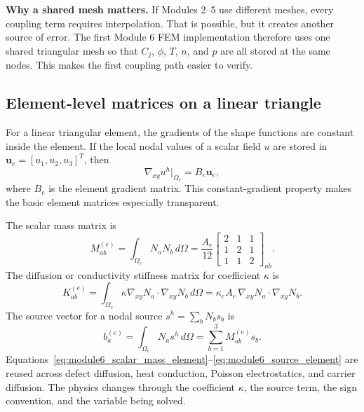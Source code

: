 \documentclass[11pt]{article}
\newcommand{\gradxy}{\nabla_{xy}}
\begin{document}
\begin{physicsbox}
\textbf{Why a shared mesh matters.} If Modules 2--5 use different meshes, every coupling term requires interpolation. That is possible, but it creates another source of error. The first Module 6 FEM implementation therefore uses one shared triangular mesh so that \(C_j\), \(\phi\), \(T\), \(n\), and \(p\) are all stored at the same nodes. This makes the first coupling path easier to verify.
\end{physicsbox}

\subsection{Element-level matrices on a linear triangle}

For a linear triangular element, the gradients of the shape functions are constant inside the element. If the local nodal values of a scalar field \(u\) are stored in \(\mathbf{u}_e=[u_1,u_2,u_3]^T\), then
\begin{equation}
\gradxy u^h\big|_{\Omega_e}
= B_e \mathbf{u}_e,
\end{equation}
where \(B_e\) is the element gradient matrix. This constant-gradient property makes the basic element matrices especially transparent.

The scalar mass matrix is
\begin{equation}
\boxed{
M^{(e)}_{ab}=\int_{\Omega_e}N_aN_b\,d\Omega
=\frac{A_e}{12}
\begin{bmatrix}
2&1&1\\
1&2&1\\
1&1&2
\end{bmatrix}_{ab}.}
\label{eq:module6_scalar_mass_element}
\end{equation}
The diffusion or conductivity stiffness matrix for coefficient \(\kappa\) is
\begin{equation}
\boxed{
K^{(e)}_{ab}=\int_{\Omega_e}\kappa\gradxy N_a\cdot\gradxy N_b\,d\Omega
=\kappa_e A_e\,\gradxy N_a\cdot\gradxy N_b.}
\label{eq:module6_stiffness_element}
\end{equation}
The source vector for a nodal source \(s^h=\sum_b N_bs_b\) is
\begin{equation}
\boxed{
b^{(e)}_a=\int_{\Omega_e}N_a s^h\,d\Omega
=\sum_{b=1}^{3}M^{(e)}_{ab}s_b.}
\label{eq:module6_source_element}
\end{equation}
Equations~\eqref{eq:module6_scalar_mass_element}--\eqref{eq:module6_source_element} are reused across defect diffusion, heat conduction, Poisson electrostatics, and carrier diffusion. The physics changes through the coefficient \(\kappa\), the source term, the sign convention, and the variable being solved.
\end{document}
